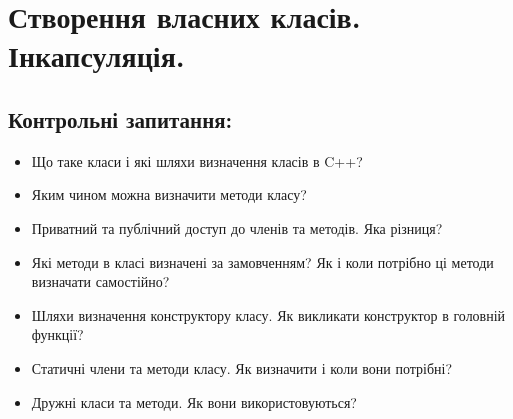 \documentclass[a5paper,titlepage,openany,twoside,draft]{book_unv}%
\begin{document}
\chapter{Створення власних класів. Інкапсуляція.}
%

\section{Контрольні запитання:}
\begin{itemize}
\item
Що таке класи і які шляхи визначення класів в C++?
\item
Яким чином можна визначити методи класу?
\item
Приватний та публічний доступ до членів та методів. Яка різниця?
\item
Які методи в класі визначені за замовченням? Як і коли потрібно ці
методи визначати самостійно?
\item 
Шляхи визначення конструктору класу. Як викликати конструктор в
головній функції?
\item
Статичні члени та методи класу. Як визначити і коли вони потрібні?
\item 
Дружні класи та методи. Як вони використовуються?
\end{itemize}
\end{document}
